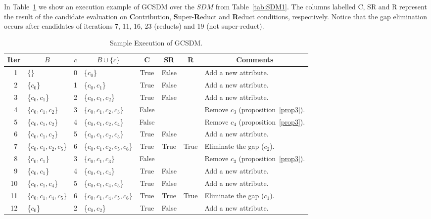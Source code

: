 \documentclass[authoryear,11pt]{elsarticle}
\begin{document}
	In Table~\ref{tab:sample_GCSDM} we show an execution example of GCSDM over the $SDM$ from Table~\ref{tab:SDM1}.
	The columns labelled C, SR and R represent the result of the candidate evaluation on
	\textbf{C}ontribution, \textbf{S}uper-\textbf{R}educt and \textbf{R}educt conditions, respectively. Notice that
	the gap elimination occurs after candidates of iterations 7, 11, 16, 23 (reducts) and 19 (not super-reduct).
	
	\begin{table}[!htb]
		\caption{Sample Execution of GCSDM.}\label{tab:sample_GCSDM}
      	\centering
    		\begin{tabular}{|c|l|c|l|c|c|c|l|}
    		\hline
    		Iter & \multicolumn{1}{c|}{$B$} & $c$ & \multicolumn{1}{c|}{$B\cup \lbrace c\rbrace$} 
    		& C & SR & R & \multicolumn{1}{c|}{Comments}\\
    		\hline
    		~1 & \{\} 					& 0 & \{$c_0$\} 					& True & False &   & Add a new attribute.\\
    		~2 & \{$c_0$\} 				& 1 & \{$c_0,c_1$\}				& True & False &   & Add a new attribute.\\
    		~3 & \{$c_0,c_1$\} 			& 2 & \{$c_0,c_1,c_2$\}			& True & False &   & Add a new attribute.\\
    		~4 & \{$c_0,c_1,c_2$\} 		& 3 & \{$c_0,c_1,c_2,c_3$\}		& False &   &   & Remove $c_3$ (proposition~\ref{prop3}).\\
    		~5 & \{$c_0,c_1,c_2$\} 		& 4 & \{$c_0,c_1,c_2,c_4$\}		& False &   &   & Remove $c_4$ (proposition~\ref{prop3}).\\
    		~6 & \{$c_0,c_1,c_2$\}		& 5 & \{$c_0,c_1,c_2,c_5$\}		& True & False &   & Add a new attribute.\\
    		~7 & \{$c_0,c_1,c_2,c_5$\}	& 6 & \{$c_0,c_1,c_2,c_5,c_6$\} 	& True & True & True & Eliminate the gap ($c_2$).\\
    		~8 & \{$c_0,c_1$\} 			& 3 & \{$c_0,c_1,c_3$\}			& False &   &   & Remove $c_3$ (proposition~\ref{prop3}).\\
    		~9 & \{$c_0,c_1$\}			& 4 & \{$c_0,c_1,c_4$\}			& True & False &   & Add a new attribute.\\
    		10 & \{$c_0,c_1,c_4$\}		& 5 & \{$c_0,c_1,c_4,c_5$\}		& True & False &   & Add a new attribute.\\
    		11 & \{$c_0,c_1,c_4,c_5$\}	& 6 & \{$c_0,c_1,c_4,c_5,c_6$\} 	& True & True & True & Eliminate the gap ($c_1$).\\
    		12 & \{$c_0$\} 				& 2 & \{$c_0,c_2$\}				& True & False &   & Add a new attribute.\\

\end{tabular}
\end{table}
\end{document}
